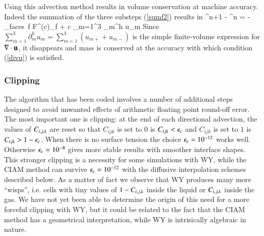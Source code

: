 Using  this advection method  results in volume conservation at machine accuracy. 
Indeed the summation of the three substeps (\ref{sumf2}) results in 
\be
{\cijk^{n+1} - \cijk^{n}} = - \sum_{\rm{faces}\, f} F^{(c)}_f 
+ c \sum_{m=1}^{3} \partial_{m}^h u_m \label{sumfall2}
\nd
Since $\sum_{m=1}^{3} \partial_{m}^h u_m = \sum_{m=1}^{3} (u_{m+}  + u_{m-}) $ is the simple 
finite-volume expression for $\nabla \cdot {\bf u}$, it disappears and mass is conserved at the 
accuracy with which condition (\ref{divu}) is satisfied. 

\subsubsection{Clipping}
\label{clipping}

The algorithm that has been coded involves a number of additional
steps designed to avoid unwanted effects of arithmetic floating point
round-off error. The most important one is clipping: at the end of
each directional advection, the values of $C_{i,j,k}$ are reset so that
$C_{ijk}$ is set to $0$ is $C_{ijk} < \epsilon_c$ and $C_{ijk}$ is set to
$1$ is $C_{ijk} > 1 - \epsilon_c$. When there is no surface tension 
the choice $\epsilon_c = 10^{-12}$ works well.
Otherwise $\epsilon_c = 10^{-8}$ gives more stable results with smoother
interface shapes. This stronger clipping is a necessity for some
simulations with WY, while the CIAM method can survive $\epsilon_c =
10^{-12}$ with the diffusive interpolation schemes described below.  
As a matter of fact we observe that WY produces many more ``wisps'', 
i.e. cells with tiny values of $1-C_{i,j,k}$
inside the liquid or $C_{i,j,k}$ inside the gas.
We have not yet been able to determine the origin of this need for a more
forceful clipping with WY, but it could be related to the fact that the
CIAM method has a geometrical interpretation, while WY is intrisically algebraic
in nature.
